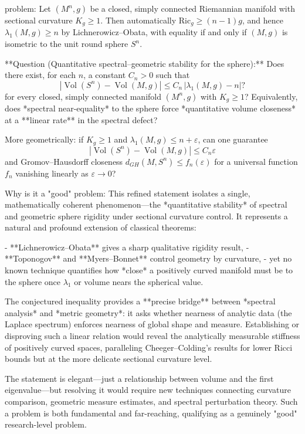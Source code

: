 problem:  
Let \( (M^n,g) \) be a closed, simply connected Riemannian manifold with sectional curvature \( K_g \ge 1 \). Then automatically \( \mathrm{Ric}_g \ge (n-1)g \), and hence \( \lambda_1(M,g) \ge n \) by Lichnerowicz–Obata, with equality if and only if \( (M,g) \) is isometric to the unit round sphere \( S^n \).  

**Question (Quantitative spectral–geometric stability for the sphere):**  
Does there exist, for each \( n \), a constant \( C_n>0 \) such that  
\[
|\operatorname{Vol}(S^n) - \operatorname{Vol}(M,g)| \le C_n \,|\lambda_1(M,g) - n|?
\]
for every closed, simply connected manifold \( (M^n,g) \) with \( K_g \ge 1 \)?  
Equivalently, does *spectral near-equality* to the sphere force *quantitative volume closeness* at a **linear rate** in the spectral defect?  

More geometrically: if \( K_g \ge 1 \) and \( \lambda_1(M,g) \le n+\varepsilon \), can one guarantee  
\[
|\operatorname{Vol}(S^n) - \operatorname{Vol}(M,g)| \le C_n \varepsilon
\]
and Gromov–Hausdorff closeness \( d_{GH}(M,S^n) \le f_n(\varepsilon) \) for a universal function \( f_n \) vanishing linearly as \( \varepsilon\to0 \)?  

Why is it a "good" problem:  
This refined statement isolates a single, mathematically coherent phenomenon—the *quantitative stability* of spectral and geometric sphere rigidity under sectional curvature control. It represents a natural and profound extension of classical theorems:

- **Lichnerowicz–Obata** gives a sharp qualitative rigidity result,
- **Toponogov** and **Myers–Bonnet** control geometry by curvature,
- yet no known technique quantifies how *close* a positively curved manifold must be to the sphere once \( \lambda_1 \) or volume nears the spherical value.

The conjectured inequality provides a **precise bridge** between *spectral analysis* and *metric geometry*: it asks whether nearness of analytic data (the Laplace spectrum) enforces nearness of global shape and measure. Establishing or disproving such a linear relation would reveal the analytically measurable stiffness of positively curved spaces, paralleling Cheeger–Colding’s results for lower Ricci bounds but at the more delicate sectional curvature level.  

The statement is elegant—just a relationship between volume and the first eigenvalue—but resolving it would require new techniques connecting curvature comparison, geometric measure estimates, and spectral perturbation theory. Such a problem is both fundamental and far-reaching, qualifying as a genuinely "good" research-level problem.